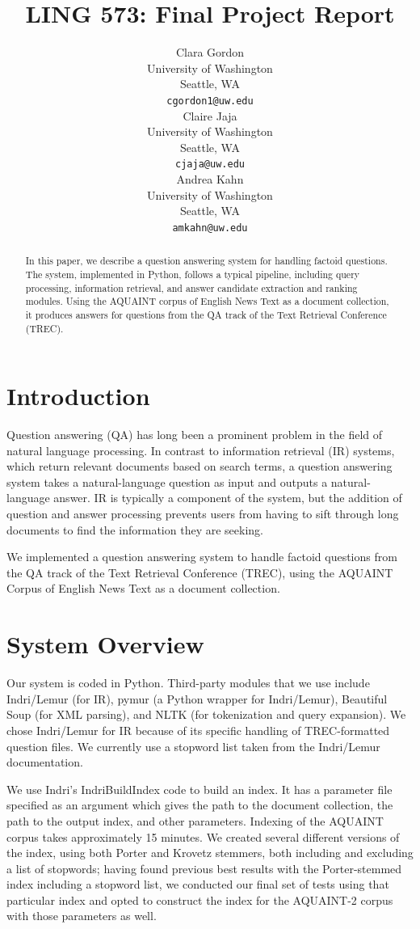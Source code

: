 \documentclass[11pt]{article}
\title{LING 573: Final Project Report}
\author{Clara Gordon \\
  University of Washington \\
  Seattle, WA \\
  {\tt cgordon1@uw.edu} \\\And
  Claire Jaja \\
  University of Washington \\
  Seattle, WA \\
  {\tt cjaja@uw.edu} \\\And
  Andrea Kahn \\
  University of Washington \\
  Seattle, WA \\
  {\tt amkahn@uw.edu} \\}
\date{}
\begin{document}
\maketitle
\begin{abstract}

In this paper, we describe a question answering system for handling factoid questions.  The system, implemented in Python, follows a typical pipeline, including query processing, information retrieval, and answer candidate extraction and ranking modules. Using the AQUAINT corpus of English News Text as a document collection, it produces answers for questions from the QA track of the Text Retrieval Conference (TREC).

\end{abstract}

\section{Introduction}

Question answering (QA) has long been a prominent problem in the field of natural language processing. In contrast to information retrieval (IR) systems, which return relevant documents based on search terms, a question answering system takes a natural-language question as input and outputs a natural-language answer. IR is typically a component of the system, but the addition of question and answer processing prevents users from having to sift through long documents to find the information they are seeking.

We implemented a question answering system to handle factoid questions from the QA track of the Text Retrieval Conference (TREC), using the AQUAINT Corpus of English News Text as a document collection.

\section{System Overview}

Our system is coded in Python. Third-party modules that we use include Indri/Lemur (for IR), pymur (a Python wrapper for Indri/Lemur), Beautiful Soup (for XML parsing), and NLTK (for tokenization and query expansion). We chose Indri/Lemur for IR because of its specific handling of TREC-formatted question files. We currently use a stopword list taken from the Indri/Lemur documentation.

We use Indri's IndriBuildIndex code to build an index.  It has a parameter file specified as an argument which gives the path to the document collection, the path to the output index, and other parameters.  Indexing of the AQUAINT corpus takes approximately 15 minutes.  We created several different versions of the index, using both Porter and Krovetz stemmers, both including and excluding a list of stopwords; having found previous best results with the Porter-stemmed index including a stopword list, we conducted our final set of tests using that particular index and opted to construct the index for the AQUAINT-2 corpus with those parameters as well.
\end{document}
